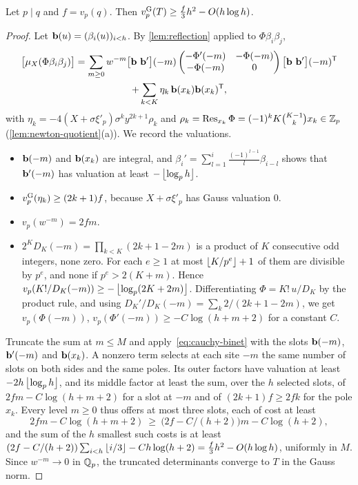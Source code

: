 \begin{proposition}\label{prop:p-divides-q}
Let $p\mid q$ and $f=v_p(q)$. Then $v_{p}^{\mathrm{G}}(T)\ge\frac f3h^2-O(h\log h)$.
\end{proposition}

\begin{proof}
Let $\mathbf{b}(u)=(\beta_i(u))_{i<h}$. By \cref{lem:reflection} applied to $\Phi\beta_i\beta_j$,
\begin{multline*}
  \bigl[\mu_X(\Phi\beta_i\beta_j)\bigr]=\sum_{m\ge0}w^{-m}\bigl[\bvec\ \bvec'\bigr](-m)
  \begin{pmatrix}-\Phi'(-m)&-\Phi(-m)\\-\Phi(-m)&0\end{pmatrix}
  \bigl[\bvec\ \bvec'\bigr](-m)^{\mathsf T}\\
  +\sum_{k<K}\eta_k\,\bvec(x_k)\bvec(x_k)^{\mathsf T},
\end{multline*}
with $\eta_k=-4(X+\sigma\xi'_p)\sigma^ky^{2k+1}\rho_k$ and
$\rho_k=\operatorname*{Res}_{x_k}\Phi=(-1)^kK\binom{K-1}kx_k\in\mathbb{Z}_p$
(\cref{lem:newton-quotient}(a)). We record the valuations.
\begin{itemize}
\item $\mathbf{b}(-m)$ and $\mathbf{b}(x_k)$ are integral, and $\beta_i'=\sum_{l=1}^{i}\frac{(-1)^{l-1}}{l}
\beta_{i-l}$ shows that $\mathbf{b}'(-m)$ has valuation at least $-\left\lfloor \log_ph\right\rfloor$.
\item $v_{p}^{\mathrm{G}}(\eta_k)\ge(2k+1)f$, because $X+\sigma\xi'_p$ has Gauss valuation $0$.
\item $v_p(w^{-m})=2fm$.
\item $2^KD_K(-m)=\prod_{k<K}(2k+1-2m)$ is a product of $K$ consecutive odd integers, none zero.
For each $e\ge1$ at most $\left\lfloor K/p^e\right\rfloor+1$ of them are divisible by $p^e$, and none if
$p^e>2(K+m)$. Hence $v_p(K!/D_K(-m))\ge-\left\lfloor \log_p(2K+2m)\right\rfloor$. Differentiating
$\Phi=K!\,u/D_K$ by the product rule, and using
$D_K'/D_K(-m)=\sum_k2/(2k+1-2m)$, we get $v_p(\Phi(-m))$, $v_p(\Phi'(-m))\ge
-C\log(h+m+2)$ for a constant $C$.
\end{itemize}
Truncate the sum at $m\le M$ and apply~\eqref{eq:cauchy-binet} with the slots $\mathbf{b}(-m)$,
$\mathbf{b}'(-m)$ and $\mathbf{b}(x_k)$. A nonzero term selects at each site $-m$ the same number of slots
on both sides and the same poles. Its outer factors have valuation at least $-2h\left\lfloor \log_ph\right\rfloor$,
and its middle factor at least the sum, over the $h$ selected slots, of $2fm-C\log(h+m+2)$ for a
slot at $-m$ and of $(2k+1)f\ge2fk$ for the pole $x_k$. Every level $m\ge0$ thus offers at most
three slots, each of cost at least
\[
  2fm-C\log(h+m+2)\ \ge\ \bigl(2f-C/(h+2)\bigr)m-C\log(h+2),
\]
and the sum of the $h$ smallest such costs is at least
$(2f-C/(h+2))\sum_{i<h}\left\lfloor i/3\right\rfloor-Ch\log(h+2)=\frac f3h^2-O(h\log h)$, uniformly in $M$. Since
$w^{-m}\to0$ in $\mathbb{Q}_p$, the truncated determinants converge to $T$ in the Gauss norm.
\end{proof}

